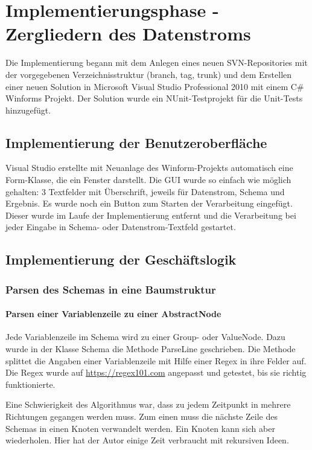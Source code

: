 \section{Implementierungsphase - Zergliedern des Datenstroms} 
\label{sec:ImplementierungsphaseDatenstromZergliedern}


Die Implementierung begann mit dem Anlegen eines neuen SVN-Repositories mit der vorgegebenen Verzeichnisstruktur (branch, tag, trunk) und dem Erstellen einer neuen Solution in Microsoft Visual Studio Professional 2010 mit einem C\# Winforms Projekt. Der Solution wurde ein NUnit-Testprojekt für die Unit-Tests hinzugefügt.

\subsection{Implementierung der Benutzeroberfläche}
\label{sec:ImplementierungBenutzeroberflaeche}
Visual Studio erstellte mit Neuanlage des Winform-Projekts automatisch eine Form-Klasse, die ein Fenster darstellt.
Die GUI wurde so einfach wie möglich gehalten: 3 Textfelder mit Überschrift, jeweils für Datenstrom, Schema und Ergebnis. Es wurde noch ein Button zum Starten der Verarbeitung eingefügt. Dieser wurde im Laufe der Implementierung  entfernt und die Verarbeitung bei jeder Eingabe in Schema- oder Datenstrom-Textfeld gestartet.


\subsection{Implementierung der Geschäftslogik}
\label{sec:ImplementierungGeschaeftslogik}
\subsubsection{Parsen des Schemas in eine Baumstruktur}
\label{sec:ParsenSchema}
\paragraph{Parsen einer Variablenzeile zu einer AbstractNode}
Jede Variablenzeile im Schema wird zu einer Group- oder ValueNode. Dazu wurde in der Klasse Schema die Methode ParseLine geschrieben. Die Methode splittet die Angaben einer Variablenzeile mit Hilfe einer \ac{Regex} in ihre Felder auf. Die \ac{Regex} wurde auf \href{https://regex101.com}{https://regex101.com} angepasst und getestet, bis sie richtig funktionierte.

Eine Schwierigkeit des Algorithmus war, dass zu jedem Zeitpunkt in mehrere Richtungen gegangen werden muss. Zum einen muss die nächste Zeile des Schemas in einen Knoten verwandelt werden. Ein Knoten kann sich aber wiederholen.
Hier hat der Autor einige Zeit verbraucht mit rekursiven Ideen.

